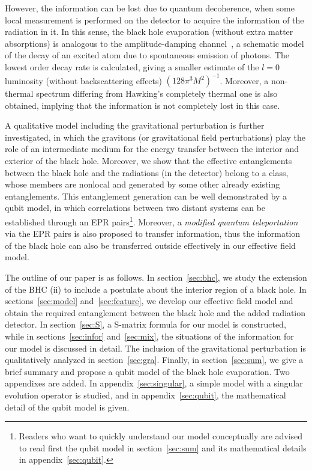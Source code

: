 \documentclass[12pt,a4paper]{article}
\begin{document}
However, the information can be lost due to quantum decoherence, when some local measurement is
performed on the detector to acquire the information of the
radiation in it. In this sense, the black hole evaporation (without
extra matter absorptions) is analogous to the amplitude-damping
channel~\cite{i}, a schematic model of the decay of an excited atom
due to spontaneous emission of photons. The lowest order decay rate
is calculated, giving a smaller estimate of the $l=0$ luminosity (without
backscattering effects) $(128\pi^3 M^2)^{-1}$. Moreover, a
non-thermal spectrum differing from Hawking's completely thermal one
is also obtained, implying that the information is not completely
lost in this case.

A qualitative model including the gravitational perturbation is further investigated, in which the gravitons (or gravitational field
perturbations) play the role of an intermediate medium for the energy transfer between the interior and exterior of the black hole. Moreover, we show that the effective entanglements
between the black hole and the radiations (in the detector) belong to a class, whose members are nonlocal and generated by some other already existing entanglements.
This entanglement generation can be well demonstrated by a qubit model, in which correlations between two distant systems can be established through an EPR pairs\footnote{Readers who want to quickly understand our model conceptually are advised to read first the qubit model in section~\ref{sec:sum} and its mathematical details in appendix~\ref{sec:qubit}.}. Moreover, a \emph{modified quantum teleportation} via the EPR pairs is also proposed to transfer information, thus the information of the black hole can also be transferred outside effectively in our effective field model.

The outline of our paper is as follows. In section~\ref{sec:bhc}, we study the extension of the BHC (ii) to include a postulate about the interior region of a black hole. In sections~\ref{sec:model} and~\ref{sec:feature}, we develop our effective field model and obtain the required entanglement between the black hole and the added radiation detector. In section~\ref{sec:S}, a S-matrix formula for our model is constructed, while in sections~\ref{sec:infor} and~\ref{sec:mix}, the situations of the information for our model is discussed in detail. The inclusion of the gravitational perturbation is qualitatively analyzed in section~\ref{sec:gra}. Finally, in section~\ref{sec:sum}, we give a brief summary and propose a qubit model of the black hole evaporation. Two appendixes are added. In appendix~\ref{sec:singular}, a simple model with a singular evolution operator is studied, and in appendix~\ref{sec:qubit}, the mathematical detail of the qubit model is given.
\end{document}
